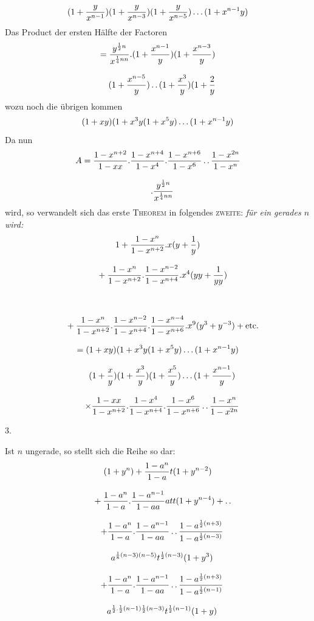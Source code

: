 


\[
(1+\frac{y}{x^{n-1}})(1+\frac{y}{x^{n-3}})(1+\frac{y}{x^{n-5}})\mathinner{.\,.\,.}(1+x^{n-1}y)
\]
Das Product der ersten Hälfte der Factoren
\[
\begin{gathered}=\frac{y^{\frac12n}}{x^{\frac14nn}}.(1+\frac{x^{n-1}}y)(1+\frac{x^{n-3}}y)\\[8pt]\quad{}(1+\frac{x^{n-5}}y)\mathinner{.\,.}(1+\frac{x^3}y)(1+\frac{2}{y}\end{gathered}
\]
wozu noch die übrigen kommen
\[
(1+xy)(1+x^3y(1+x^5y)\mathinner{.\,.\,.}(1+x^{n-1}y)
\]
Da nun
\[
\begin{gathered}A=\frac{1-x^{n+2}}{1-xx}.\frac{1-x^{n+4}}{1-x^4}.\frac{1-x^{n+6}}{1-x^6}\mathinner{.\,.}\frac{1-x^{2n}}{1-x^n}\\[8pt]\quad{}.\frac{y^{\frac12n}}{x^{\frac14nn}}\end{gathered}
\]
wird, so verwandelt sich das erste \textsc{Theorem} in folgendes \textsc{zweite}: \textit{für ein gerades $n$ wird:}
\[
\begin{gathered}
1+\frac{1-x^n}{1-x^{n+2}}.x(y+\frac1y)
\\[8pt]\quad{}+\frac{1-x^n}{1-x^{n+2}}.\frac{1-x^{n-2}}{1-x^{n+4}}.x^4(yy+\frac1{yy})\\[8pt]
\quad\\[8pt]\quad{}+\frac{1-x^n}{1-x^{n+2}}.\frac{1-x^{n-2}}{1-x^{n+4}}.\frac{1-x^{n-4}}{1-x^{n+6}}.x^9(y^3+y^{-3})+\text{etc.}\\[8pt]
=(1+xy)(1+x^3y(1+x^5y)\mathinner{.\,.\,.}(1+x^{n-1}y)
\\[8pt]\quad{}(1+\frac xy)(1+\frac{x^3}y)(1+\frac{x^5}y)\mathinner{.\,.\,.}(1+\frac{x^{n-1}}y)\\[8pt]
\quad\times\frac{1-xx}{1-x^{n+2}}.\frac{1-x^4}{1-x^{n+4}}.\frac{1-x^6}{1-x^{n+6}}\mathinner{.\,.}\frac{1-x^n}{1-x^{2n}}
\end{gathered}
\]
\par\medskip{}\centerline{3.}\nobreak\smallskip
Ist $n$ ungerade, so stellt sich die Reihe so dar:
\[
\begin{gathered}
(1+y^n)+\frac{1-a^n}{1-a}t(1+y^{n-2})
\\[8pt]\quad{}+\frac{1-a^n}{1-a}.\frac{1-a^{n-1}}{1-aa}att(1+y^{n-4})+\mathinner{.\,.}\\[8pt]
\quad+\frac{1-a^n}{1-a}.\frac{1-a^{n-1}}{1-aa}\mathinner{.\,.}\frac{1-a^{\frac12(n+3)}}{1-a^{\frac12(n-3)}}\\[8pt]\quad{}a^{\frac18(n-3)(n-5)}t^{\frac12(n-3)}(1+y^3)\\[8pt]
\quad+\frac{1-a^n}{1-a}.\frac{1-a^{n-1}}{1-aa}\mathinner{.\,.}\frac{1-a^{\frac12(n+3)}}{1-a^{\frac12(n-1)}}\\[8pt]\quad{}a^{\frac12.\frac12(n-1)\frac12(n-3)}t^{\frac12(n-1)}(1+y)
\end{gathered}
\]
